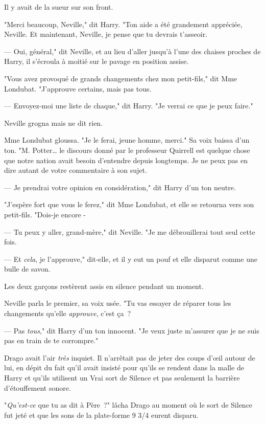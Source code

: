 Il y avait de la sueur sur son front.

"Merci beaucoup, Neville," dit Harry. "Ton aide a été grandement appréciée, Neville. Et maintenant, Neville, je pense que tu devrais t'asseoir.

--- Oui, général," dit Neville, et au lieu d'aller jusqu'à l'une des chaises proches de Harry, il s'écroula à moitié sur le pavage en position assise.

"Vous avez provoqué de grands changements chez mon petit-fils," dit Mme Londubat. "J'approuve certains, mais pas tous.

--- Envoyez-moi une liste de chaque," dit Harry. "Je verrai ce que je peux faire."

Neville grogna mais ne dit rien.

Mme Londubat gloussa. "Je le ferai, jeune homme, merci." Sa voix baissa d'un ton. "M. Potter… le discours donné par le professeur Quirrell est quelque chose que notre nation avait besoin d'entendre depuis longtemps. Je ne peux pas en dire autant de votre commentaire à son sujet.

--- Je prendrai votre opinion en considération," dit Harry d'un ton neutre.

"J'espère fort que vous le ferez," dit Mme Londubat, et elle se retourna vers son petit-fils. "Dois-je encore -

--- Tu peux y aller, grand-mère," dit Neville. "Je me débrouillerai tout seul cette fois.

--- Et \emph{cela}, je l'approuve," dit-elle, et il y eut un pouf et elle disparut comme une bulle de savon.

Les deux garçons restèrent assis en silence pendant un moment.

Neville parla le premier, sa voix usée. "Tu vas essayer de réparer tous les changements qu'elle \emph{approuve}, c'est ça~?

--- Pas \emph{tous}," dit Harry d'un ton innocent. "Je veux juste m'assurer que je ne suis pas en train de te corrompre."

\later

Drago avait l'air \emph{très} inquiet. Il n'arrêtait pas de jeter des coups d'œil autour de lui, en dépit du fait qu'il avait insisté pour qu'ils se rendent dans la malle de Harry et qu'ils utilisent un Vrai sort de Silence et pas seulement la barrière d'étouffement sonore.

"\emph{Qu'est-ce} que tu as dit à Père~?" lâcha Drago au moment où le sort de Silence fut jeté et que les sons de la plate-forme 9 3/4 eurent disparu.

